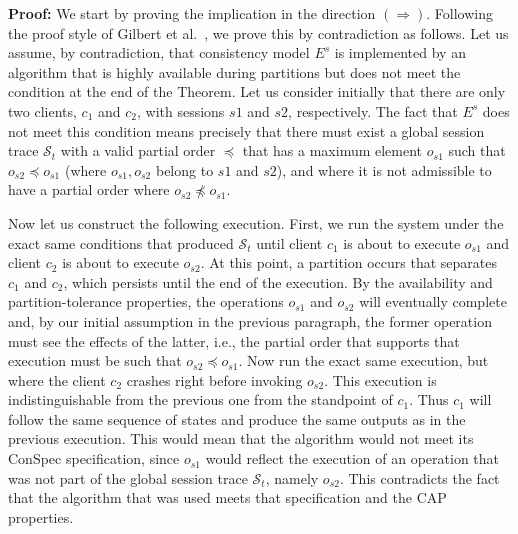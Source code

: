\documentclass[acmlarge, ,11pt]{acmart}
\begin{document}

\par \textbf{Proof:} We start by proving the implication in the direction $(\Rightarrow)$. Following the proof style of Gilbert et al.~\cite{Gilbert:2002:BCF:564585.564601}, we prove this by contradiction as follows.  Let us assume, by contradiction, that consistency model $E^s$ is implemented by an algorithm that is highly available during partitions but does not meet the condition at the end of the Theorem. Let us consider initially that there are only two clients, $c_1$ and $c_2$, with sessions $s1$ and $s2$, respectively. The fact that $E^s$  does not meet this condition means precisely that there must exist a global session trace $\mathcal{S}_t$ with a valid partial order $\preccurlyeq$ that has a maximum element $o_{s1}$ such that $o_{s2}\preccurlyeq o_{s1}$ (where $o_{s1},o_{s2}$ belong to $s1$ and $s2$), and where it is not admissible to have a partial order where $o_{s2}\not\preccurlyeq o_{s1}$.

Now let us construct the following execution. First, we run the system under the exact same conditions that produced $\mathcal{S}_t$ until client $c_1$ is about to execute $o_{s1}$ and client $c_2$ is about to execute $o_{s2}$. At this point, a partition occurs that separates $c_1$ and $c_2$, which persists until the end of the execution. By the availability and partition-tolerance properties, the operations $o_{s1}$ and $o_{s2}$ will eventually complete and, by our initial assumption in the previous paragraph, the former operation must see the effects of the latter, i.e., the partial order that supports that execution must be such that $o_{s2}\preccurlyeq o_{s1}$. Now run the exact same execution, but where the client $c_2$ crashes right before invoking $o_{s2}$. This execution is indistinguishable from the previous one from the standpoint of $c_1$. Thus $c_1$ will follow the same sequence of states and produce the same outputs as in the previous execution. This would mean that the algorithm would not meet its ConSpec specification, since $o_{s1}$ would reflect the execution of an operation that was not part of the global session trace $\mathcal{S}_t$, namely $o_{s2}$. This contradicts the fact that the algorithm that was used meets that specification and the CAP properties.
\end{document}

